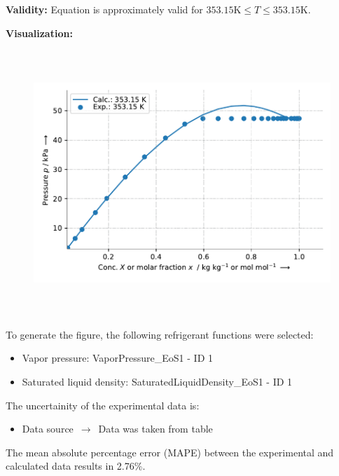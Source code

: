 \textbf{Validity:}
\newline
Equation is approximately valid for $353.15 \si{\kelvin} \leq T \leq 353.15 \si{\kelvin}$.
\newline

\textbf{Visualization:}
%
\begin{figure}[!htp]
{\noindent\includegraphics[height=10cm, keepaspectratio]{figs/abs/abs_Water_ionic_liquid_[EMIM]+[(CF3SO2)2N]-_UniquacFixedDu_2.pdf}}
\end{figure}
%

To generate the figure, the following refrigerant functions were selected:
\begin{itemize}
\item Vapor pressure: VaporPressure\_EoS1 - ID 1
\item Saturated liquid density: SaturatedLiquidDensity\_EoS1 - ID 1
\end{itemize}

The uncertainity of the experimental data is:
\begin{itemize}
\item Data source $\,\to\,$ Data was taken from table
\end{itemize}

The mean absolute percentage error (MAPE) between the experimental and calculated data results in 2.76\%.
\FloatBarrier
\newpage
